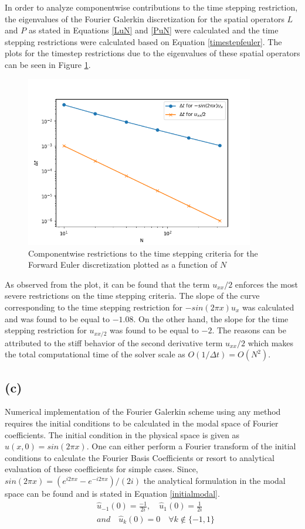 \documentclass[12pt]{article}
\begin{document}
In order to analyze componentwise contributions to the time stepping restriction, the eigenvalues of the Fourier Galerkin discretization for the spatial operators $L$ and $P$ as stated in Equations \ref{LuN} and \ref{PuN} were calculated and the time stepping restrictions were calculated based on Equation \ref{timestepfeuler}. The plots for the timestep restrictions due to the eigenvalues of these spatial operators can be seen in Figure \ref{fig:componentwise_restriction}.
\begin{figure}
    \centering
    \includegraphics[width=10cm]{dtComponentwise_Q1.png}
    \caption{Componentwise restrictions to the time stepping criteria for the Forward Euler discretization plotted as a function of $N$}
    \label{fig:componentwise_restriction}
\end{figure}
As observed from the plot, it can be found that the term $u_{xx}/2$ enforces the most severe restrictions on the time stepping criteria. The slope of the curve corresponding to the time stepping restriction for $-sin(2 \pi x)u_x$ was calculated and was found to be equal to $-1.08$. On the other hand, the slope for the time stepping restriction for $u_{xx/2}$ was found to be equal to $-2$. The reasons can be attributed to the stiff behavior of the second derivative term $u_{xx}/2$ which makes the total computational time of the solver scale as $O(1/\Delta t) = O(N^2)$.  
\subsection{(c)}
Numerical implementation of the Fourier Galerkin scheme using any method requires the initial conditions to be calculated in the modal space of Fourier coefficients. The initial condition in the physical space is given as $u(x, 0) = sin(2 \pi x)$. One can either perform a Fourier transform of the initial conditions to calculate the Fourier Basis Coefficients or resort to analytical evaluation of these coefficients for simple cases. Since, $sin(2 \pi x) = (e^{i 2 \pi x} - e^{-i 2 \pi x})/(2i)$ the analytical formulation in the modal space can be found and is stated in Equation \ref{initialmodal}.
\begin{equation}
    \begin{aligned}
        & \hat{u}_{-1}(0) = \frac{-1}{2i}, \quad \hat{u}_{1}(0) = \frac{1}{2i} \\
        & and \quad \hat{u}_k(0) = 0 \quad \forall k \notin \{ -1, 1 \}
    \end{aligned}
    \label{initialmodal}
\end{equation}
\end{document}
